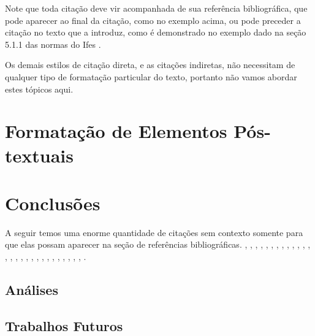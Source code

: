 \documentclass[times,english,brazil,oneside,section=TITLE]{ifes8}
\begin{document}
Note que toda citação deve vir acompanhada de sua referência
bibliográfica, que pode aparecer ao final da citação, como no exemplo
acima, ou pode preceder a citação no texto que a introduz, como é
demonstrado no exemplo dado na seção 5.1.1 das normas do Ifes
\cite[p.~39]{Ifes2017}.

Os demais estilos de citação direta, e as citações indiretas, não
necessitam de qualquer tipo de formatação particular do texto,
portanto não vamos abordar estes tópicos aqui.



\chapter{Formatação de Elementos Pós-textuais}
\label{cha:format-pos-text}



\chapter{Conclusões}

A seguir temos uma enorme quantidade de citações sem contexto somente
para que elas possam aparecer na seção de referências bibliográficas.
\cite{abntex2classe}, \cite{abntex2-wiki-como-customizar},
\cite{abntex2modelo-artigo}, \cite{abntex2modelo-relatorio},
\cite{abntex2modelo}, \cite{abntex2cite}, \cite{abntex2cite-alf},
\cite{Ifes2017}, \cite{NBR6024:2012}, \cite{araujo2012},
\cite{talbot2012}, \cite{NBR14724:2011}, \cite{EIA649B},
\cite{bates2010}, \cite{memoir}, \cite{masolo2010}, \cite{babel},
\cite{NBR14724:2005}, \cite{macedo2005}, \cite{guizzardi2005},
\cite{NBR6028:2003}, \cite{NBR10520:2002}, \cite{NBR14724:2002},
\cite{NBR14724:2001}, \cite{guarino1995}, \cite{ibge1993},
\cite{van86}, \cite{dewey1980}, \cite{doxiadis1965}.

\section{Análises}

\blindtext[7]

\section{Trabalhos Futuros}

\blindtext[7]
\end{document}
